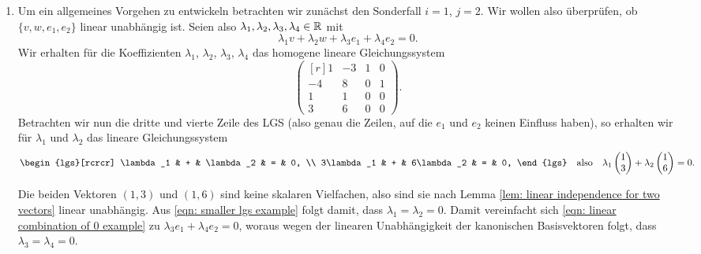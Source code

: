 \documentclass[a4paper,10pt]{article}
\begin{document}
\begin{bsp}
 \begin{enumerate}[label=\alph*)]
  \item\label{enum: small to big}
   Um ein allgemeines Vorgehen zu entwickeln betrachten wir zunächst den Sonderfall $i = 1$, $j = 2$. Wir wollen also überprüfen, ob $\{v,w,e_1,e_2\}$ linear unabhängig ist. Seien also $\lambda_1, \lambda_2, \lambda_3, \lambda_4 \in \mathbb{R}$ mit
   \begin{equation}\label{eqn: linear combination of 0 example}
    \lambda_1 v + \lambda_2 w + \lambda_3 e_1 + \lambda_4 e_2 = 0.
   \end{equation}
   Wir erhalten für die Koeffizienten $\lambda_1$, $\lambda_2$, $\lambda_3$, $\lambda_4$ das homogene lineare Gleichungssystem
   \begin{equation}\label{eqn: bigger lgs example}
    \begin{pmatrix*}[r]
      1 & -3 & 1 & 0 \\
     -4 &  8 & 0 & 1 \\
      1 &  1 & 0 & 0 \\
      3 &  6 & 0 & 0
    \end{pmatrix*}.
   \end{equation}
   Betrachten wir nun die dritte und vierte Zeile des LGS (also genau die Zeilen, auf die $e_1$ und $e_2$ keinen Einfluss haben), so erhalten wir für $\lambda_1$ und $\lambda_2$ das lineare Gleichungssystem
   \begin{equation}\label{eqn: smaller lgs example}
    \begin{lgs}[rcrcr]
      \lambda_1 & + &  \lambda_2 & = & 0, \\
     3\lambda_1 & + & 6\lambda_2 & = & 0,
    \end{lgs}
    \quad
    \text{also}
    \quad
    \lambda_1 \vect{1 \\ 3} + \lambda_2 \vect{1 \\ 6} = 0.
   \end{equation}
   
   Die beiden Vektoren $(1,3)$ und $(1,6)$ sind keine skalaren Vielfachen, also sind sie nach Lemma \ref{lem: linear independence for two vectors} linear unabhängig. Aus \eqref{eqn: smaller lgs example} folgt damit, dass $\lambda_1 = \lambda_2 = 0$. Damit vereinfacht sich \eqref{eqn: linear combination of 0 example} zu $\lambda_3 e_1 + \lambda_4 e_2 = 0$, woraus wegen der linearen Unabhängigkeit der kanonischen Basisvektoren folgt, dass $\lambda_3 = \lambda_4 = 0$.
   

\end{enumerate}
\end{bsp}
\end{document}
